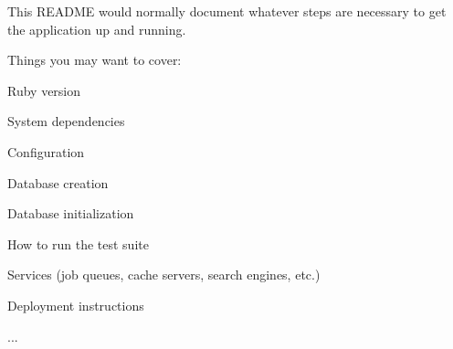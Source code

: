 This R\+E\+A\+D\+ME would normally document whatever steps are necessary to get the application up and running.

Things you may want to cover\+:


\begin{DoxyItemize}
\item Ruby version
\item System dependencies
\item Configuration
\item Database creation
\item Database initialization
\item How to run the test suite
\item Services (job queues, cache servers, search engines, etc.)
\item Deployment instructions
\item ... 
\end{DoxyItemize}